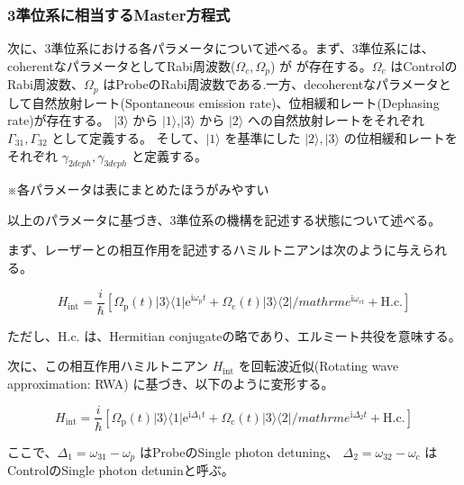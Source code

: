 \documentclass[11pt,a4paper]{ltjsarticle}
\begin{document}
\subsubsection{3準位系に相当するMaster方程式}
次に、3準位系における各パラメータについて述べる。まず、3準位系には、coherentなパラメータとしてRabi周波数($\Omega_{c},\Omega_{p}$) が
が存在する。$\Omega_c$ はControlのRabi周波数、$\Omega_p$ はProbeのRabi周波数である.一方、decoherentなパラメータとして自然放射レート(Spontaneous emission rate)、位相緩和レート(Dephasing rate)が存在する。
$| 3 \rangle$ から $| 1 \rangle$,$| 3 \rangle$ から $| 2 \rangle$ への自然放射レートをそれぞれ $\Gamma_{31},\Gamma_{32}$ として定義する。
そして、$| 1 \rangle$ を基準にした $| 2 \rangle,| 3 \rangle$ の位相緩和レートをそれぞれ $\gamma_{2 deph}, \gamma_{3 deph}$ と定義する。


{\color{red}※各パラメータは表にまとめたほうがみやすい}

以上のパラメータに基づき、3準位系の機構を記述する状態について述べる。

まず、レーザーとの相互作用を記述するハミルトニアンは次のように与えられる。



\begin{equation*}
 H_{ \mathrm{int} } = \frac{i}{\hbar} \left[ \Omega_{ \mathrm{p} } \left( t \right) | 3 \rangle \langle 1 | \mathrm{e}^{\mathrm{i} \omega_{\mathrm{p} } t}
         + \Omega_{\mathrm{c}} \left( t \right) | 3 \rangle \langle 2 | /mathrm{e}^{\mathrm{i}  \omega_{\mathrm{c} t}  } 
         + \mathrm{H.c.}      \right]
\end{equation*}

ただし、H.c. は、Hermitian conjugateの略であり、エルミート共役を意味する。

次に、この相互作用ハミルトニアン $H_{ \mathrm{int} }$ を回転波近似(Rotating wave approximation: RWA) に基づき、以下のように変形する。

\begin{equation*}
 H_{ \mathrm{int} } = \frac{i}{\hbar} \left[ \Omega_{\mathrm{p}} \left( t \right) | 3 \rangle \langle 1 | \mathrm{e}^{\mathrm{i} \Delta_{1} t}
         + \Omega_{\mathrm{c}} \left( t \right) | 3 \rangle \langle 2 | /mathrm{e}^{\mathrm{i} \Delta_{2} t}   
         + \mathrm{H.c.}      \right]
\end{equation*}


ここで、$\Delta_{1} = \omega_{31} - \omega_{p}$ はProbeのSingle photon detuning、
$\Delta_{2} = \omega_{32} - \omega_{c}$ はControlのSingle photon detuninと呼ぶ。
\end{document}
